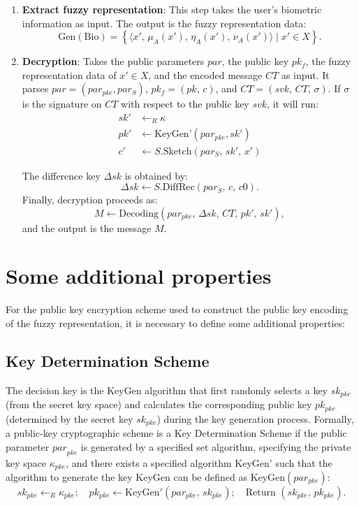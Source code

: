 \documentclass[graybox]{svmult}
\begin{document}
\begin{enumerate}
    \item \textbf{Extract fuzzy representation}: This step takes the user's biometric information as input. The output is the fuzzy representation data:
          \[
              \text{Gen}(\text{Bio}) = \left\{ \langle x', \, \mu_A(x'), \, \eta_A(x'), \, \nu_A(x') \rangle \mid x' \in X \right\}.
          \]

    \item \textbf{Decryption}: Takes the public parameters \(  par \), the public key \( pk_f \), the fuzzy representation data of \( x' \in X \), and the encoded message \( CT \) as input. It parses \( par  = (par_{pke}, par_S) \), \( pk_f = (pk, \, c) \), and \( CT = (svk, \, CT, \, \sigma) \). If \( \sigma \) is the signature on \( CT \) with respect to the public key \( svk \), it will run:
          \begin{align*}
              sk' & \leftarrow_R \kappa                              \\
              pk' & \leftarrow \text{KeyGen'}(par_{pke}, sk')        \\
              c'  & \leftarrow S.\text{Sketch}(par_S, \, sk', \, x')
          \end{align*}

          The difference key \( \Delta sk \) is obtained by:
          \[
              \Delta sk \leftarrow S.\text{DiffRec}(par_S, \, c, \, c0).
          \]
          Finally, decryption proceeds as:
          \[
              M \leftarrow \text{Decoding}(par_{pke}, \, \Delta sk, \, CT, \, pk', \, sk'),
          \]
          and the output is the message \( M \).
\end{enumerate}

\section{Some additional properties}
For the public key encryption scheme used to construct the public key encoding of the fuzzy representation, it is necessary to define some additional properties:

\subsection{Key Determination Scheme}

The decision key is the KeyGen algorithm that first randomly selects a key \( sk_{pke} \) (from the secret key space) and calculates the corresponding public key \( pk_{pke} \) \allowbreak (determined by the secret key \( {sk}_{pke} \)) during the key generation process. Formally, a public-key cryptographic scheme is a Key Determination Scheme if the public \allowbreak parameter \( {par}_{pke} \) is generated by a specified set algorithm, specifying the private key space \( \kappa_{pke} \), and there exists a specified algorithm KeyGen' such that the \allowbreak algorithm to generate the key KeyGen can be defined as \( \text{KeyGen}(par_{pke}) \):
\[
    sk_{pke} \leftarrow_R \kappa_{pke}; \quad pk_{pke} \leftarrow \text{KeyGen}'(par_{pke}, \, sk_{pke}); \quad \text{Return } (sk_{pke}, \, pk_{pke}).
\]
\end{document}
